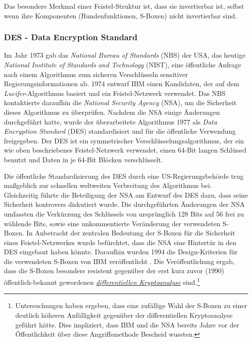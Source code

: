 Das besondere Merkmal einer Feistel-Struktur ist, dass sie invertierbar ist, selbst wenn ihre Komponenten (Rundenfunktionen, S-Boxen) nicht invertierbar sind.

\subsubsection{DES - Data Encryption Standard}
\label{sssec:des}
Im Jahr 1973 gab das \emph{National Bureau of Standards} (NBS) der USA, das heutige \emph{National Institute of Standards and Technology} (NIST), eine öffentliche Anfrage nach einem Algorithmus zum sicheren Verschlüsseln sensitiver Regierungsinformationen ab. 1974 entwarf IBM einen Kandidaten, der auf dem \emph{Lucifer}-Algorithmus basiert und ein Feistel-Netzwerk verwendet. Das NBS kontaktierte daraufhin die \emph{National Security Agency} (NSA), um die Sicherheit dieses Algorithmus zu überprüfen. Nachdem die NSA einige Änderungen durchgeführt hatte, wurde der überarbeitete Algorithmus 1977 als \emph{Data Encryption Standard} (DES) \cite{NIST_DES99} standardisiert und für die öffentliche Verwendung freigegeben. Der DES ist ein symmetrischer Verschlüsselungsalgorithmus, der ein wie oben beschriebenes Feistel-Netzwerk verwendet, einen 64-Bit langen Schlüssel benutzt und Daten in je 64-Bit Blöcken verschlüsselt. 

Die öffentliche Standardisierung des DES durch eine US-Regierungsbehörde trug maßgeblich zur schnellen weltweiten Verbreitung des Algorithmus bei. Gleichzeitig führte die Beteiligung der NSA am Entwurf des DES dazu, dass seine Sicherheit kontrovers diskutiert wurde. Die durchgeführten Änderungen der NSA umfassten die Verkürzung des Schlüssels von ursprünglich 128 Bits auf 56 frei zu wählende Bits, sowie eine unkommentierte Veränderung der verwendeten S-Boxen. In Anbetracht der zentralen Bedeutung der S-Boxen für die Sicherheit eines Feistel-Netzwerkes wurde befürchtet, dass die NSA eine Hintertür in den DES eingebaut haben könnte. Daraufhin wurden 1994 die Design-Kriterien für die verwendeten S-Boxen von IBM veröffentlicht \cite{Coppersmith1994}. Die Veröffentlichung ergab, dass die S-Boxen besonders resistent gegenüber der erst kurz zuvor (1990) öffentlich-bekannt gewordenen \hyperref[sssec:diffKryptoanalyse]{\textit{differentiellen Kryptoanalyse}} sind.\footnote{Untersuchungen haben ergeben, dass eine zufällige Wahl der S-Boxen zu einer deutlich höheren Anfälligkeit gegenüber der differentiellen Kryptoanalyse geführt hätte. Dies impliziert, dass IBM und die NSA bereits Jahre vor der Öffentlichkeit über diese Angriffsmethode Bescheid wussten.}

